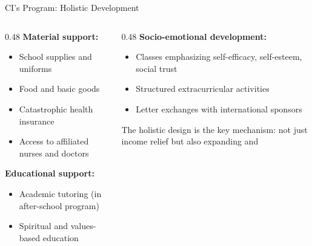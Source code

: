 \documentclass[aspectratio=169, 10pt]{beamer}
\begin{document}
\begin{frame}{CI's Program: Holistic Development}
  \begin{columns}
    \begin{column}{0.48\textwidth}
      \textbf{Material support:}
      \begin{itemize}
        \item School supplies and uniforms
        \item Food and basic goods
        \item Catastrophic health insurance
        \item Access to affiliated nurses and doctors
      \end{itemize}
      \vspace{0.6em}
      \textbf{Educational support:}
      \begin{itemize}
        \item Academic tutoring (in after-school program)
        \item Spiritual and values-based education
      \end{itemize}
    \end{column}
    \begin{column}{0.48\textwidth}
      \textbf{Socio-emotional development:}
      \begin{itemize}
        \item Classes emphasizing self-efficacy, self-esteem, social trust
        \item Structured extracurricular activities
        \item Letter exchanges with international sponsors
      \end{itemize}
      \vspace{0.4em}
      \begin{methodbox}
        \small The holistic design is the key mechanism: not just income relief but also expanding  and 
      \end{methodbox}
    \end{column}
  \end{columns}
\end{frame}
\end{document}
